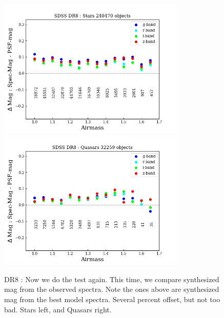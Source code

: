 \documentclass[apj,twocolumn]{aastex631}
\begin{document}
\begin{figure}%
\begin{center}
\includegraphics[angle=0,width=8.9cm]{figures/20220810_airmass_vs_dmag_dr8star.png}
\includegraphics[angle=0,width=8.9cm]{figures/20220810_airmass_vs_dmag_dr8quasar.png}
\caption{DR8 : Now we do the test again.  This time, we compare synthesized mag from the observed spectra.  Note the ones above are synthesized mag from the best model spectra. Several percent offset, but not too bad. Stars left, and Quasars right.}
\end{center}
\end{figure}
\end{document}
